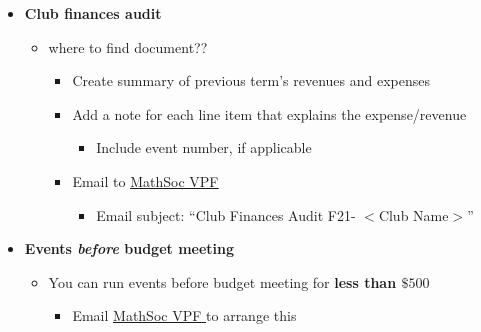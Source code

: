 \documentclass[utf8]{article}
\makeatletter
\newcommand{\termandyear}{F21}
\newcommand{\MathSocVPF}{\href{mailto:vpf@mathsoc.uwaterloo.ca}{\underline{MathSoc VPF} }}
\makeatother
\begin{document}
\begin{itemize}
\begin{itemize}
\begin{itemize}
\begin{itemize}
                \item Don't delete rows
                \item Budget carefully! You can’t go over budget
            \end{itemize}
            \item Add notes to each cell to explain the expense
            \item Email to \MathSocVPF  
            \begin{itemize}
                \item Email subject: ``Budget Submission \termandyear - $<$Club Name$>$''
            \end{itemize}
        \end{itemize}
                
    \end{itemize}
    \item \textbf{Club finances audit}
    \begin{itemize}
        \item where to find document??
        \begin{itemize}
            \item Create summary of previous term’s revenues and expenses
            \item Add a note for each line item that explains the expense/revenue
            \begin{itemize}
                \item Include event number, if applicable
            \end{itemize}
            \item Email to \MathSocVPF 
            \begin{itemize}
                \item Email subject: ``Club Finances Audit \termandyear - $<$Club Name$>$''
            \end{itemize}
        \end{itemize}
    \end{itemize}
    \item \textbf{Events \textit{before} budget meeting}
    \begin{itemize}
        \item You can run events before budget meeting for \textbf{less than $\$500$}
        \begin{itemize}
            \item Email \MathSocVPF to arrange this
            \begin{itemize}

\end{itemize}
\end{itemize}
\end{itemize}
\end{itemize}
\end{document}
